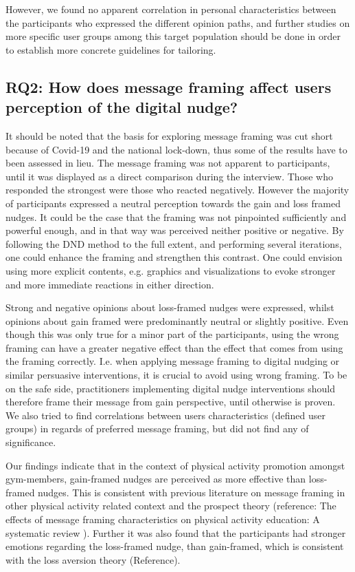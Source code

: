 However, we found no apparent correlation in personal characteristics between the participants who expressed the different opinion paths, and further studies on more specific user groups among this target population should be done in order to establish more concrete guidelines for tailoring. 

\subsection{RQ2: How does message framing affect users perception of the digital nudge?}

It should be noted that the basis for exploring message framing was cut short because of Covid-19 and the national lock-down, thus some of the results have to been assessed in lieu. The message framing was not apparent to participants, until it was displayed as a direct comparison during the interview. Those who responded the strongest were those who reacted negatively. However the majority of participants expressed a neutral perception towards the gain and loss framed nudges. It could be the case that the framing was not pinpointed sufficiently and powerful enough, and in that way was perceived neither positive or negative. By following the DND method to the full extent, and performing several iterations, one could enhance the framing and strengthen this contrast. One could envision using more explicit contents, e.g. graphics and visualizations to evoke stronger and more immediate reactions in either direction. 

Strong and negative opinions about loss-framed nudges were expressed, whilst opinions about gain framed were predominantly neutral or slightly positive. Even though this was only true for a minor part of the participants, using the wrong framing can have a greater negative effect than the effect that comes from using the framing correctly. I.e. when applying message framing to digital nudging or similar persuasive interventions, it is crucial to avoid using wrong framing. To be on the safe side, practitioners implementing digital nudge interventions should therefore frame their message from gain perspective, until otherwise is proven. We also tried to find correlations between users characteristics (defined user groups) in regards of preferred message framing, but did not find any of significance. 

Our findings indicate that in the context of physical activity promotion amongst gym-members, gain-framed nudges are perceived as more effective than loss-framed nudges. This is consistent with previous literature on message framing in other physical activity related context and the prospect theory (reference: The effects of message framing characteristics on physical activity education: A systematic review ). Further it was also found that the participants had stronger emotions regarding the loss-framed nudge, than gain-framed, which is consistent with the loss aversion theory (Reference). 

